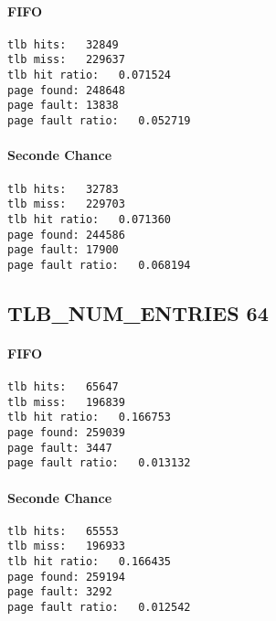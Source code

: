 \documentclass{article}
\begin{document}
\paragraph{FIFO}
\begin{lstlisting}
tlb hits:   32849
tlb miss:   229637
tlb hit ratio:   0.071524
page found: 248648
page fault: 13838
page fault ratio:   0.052719

\end{lstlisting}
\paragraph{Seconde Chance}
\begin{lstlisting}
tlb hits:   32783
tlb miss:   229703
tlb hit ratio:   0.071360
page found: 244586
page fault: 17900
page fault ratio:   0.068194

\end{lstlisting}
\subsection*{TLB_NUM_ENTRIES   64}
\paragraph{FIFO}
\begin{lstlisting}
tlb hits:   65647
tlb miss:   196839
tlb hit ratio:   0.166753
page found: 259039
page fault: 3447
page fault ratio:   0.013132

\end{lstlisting}
\paragraph{Seconde Chance}
\begin{lstlisting}
tlb hits:   65553
tlb miss:   196933
tlb hit ratio:   0.166435
page found: 259194
page fault: 3292
page fault ratio:   0.012542

\end{lstlisting}
\end{document}
